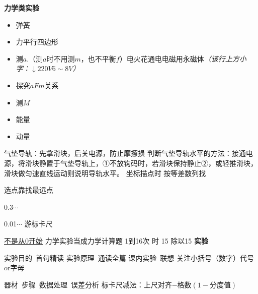 \textbf{力学类实验}
\begin{itemize}
\item 弹簧
\item 力平行四边形
\item 测$a$.（测$a$时不用测$m$，也不平衡$f$）\quad 电火花通电\quad 电磁用永磁体\quad\textit{（该行上方小字：$\downarrow$\quad $220\unit{V}$\quad $6\sim8\unit{V}$）}
\item 探究$aFm$关系
\item 测$M$
\item 能量
\item 动量
\end{itemize}
气垫导轨：先拿滑块，后关电源，防止摩擦损 %
判断气垫导轨水平的方法：接通电源，将滑块静置于气垫导轨上，①不放钩码时，若滑块保持静止②，或轻推滑块，滑块做匀速直线运动则说明导轨水平。 %
坐标描点时 按等差数列找

选点靠找最远点

0.3\quad $\cdots$

0.01\quad $\cdots$
游标卡尺

\underline{不是从0开始}
力学实验当成力学计算题
1到16次 时 15 除以15 %
\textbf{实验}\par
实验目的\ 首句精读 \quad 实验原理\ 通读全篇 \quad {}课内实验\ 联想 \quad 关注小括号（数字）代号or字母\par
器材\ 步骤\ 数据处理\ 误差分析
标卡尺\quad 减法：上尺对齐$-$格数$(1-\text{分度值})$ %

